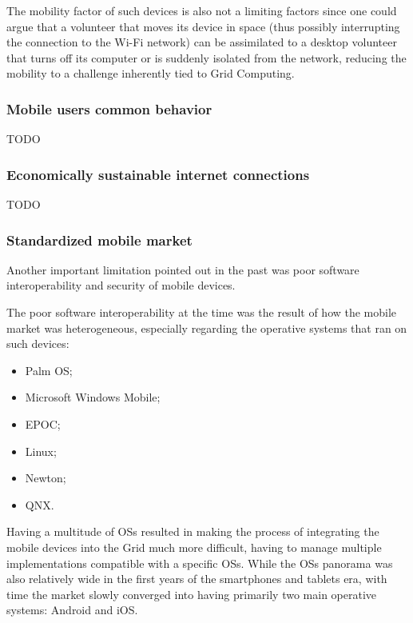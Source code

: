 The mobility factor of such devices is also not a limiting factors since one could argue that a volunteer that moves its device in space (thus possibly interrupting the connection to the Wi-Fi network) can be assimilated to a desktop volunteer that turns off its computer or is suddenly isolated from the network, reducing the mobility to a challenge inherently tied to Grid Computing.

\subsubsection{Mobile users common behavior}
TODO

\subsubsection{Economically sustainable internet connections}
TODO

\subsubsection{Standardized mobile market}
Another important limitation pointed out in the past was poor software interoperability and security of 
mobile devices.

The poor software interoperability at the time was the result of how the mobile market was heterogeneous, especially regarding the operative systems that ran on such devices:
\begin{itemize}
    \item Palm OS;
    \item Microsoft Windows Mobile;
    \item EPOC;
    \item Linux;
    \item Newton;
    \item QNX.
\end{itemize}
Having a multitude of OSs resulted in making the process of integrating the mobile devices into the Grid much more difficult, having to manage multiple implementations compatible with a specific OSs. While the OSs panorama was also relatively wide in the first years of the smartphones and tablets era, with time the market slowly converged into having primarily two main operative systems: Android and iOS.

